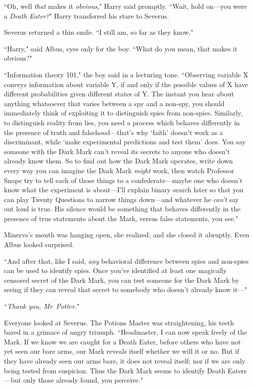 ``Oh, well \emph{that} makes it \emph{obvious}," Harry said promptly. ``Wait, hold on—you were a \emph{Death Eater?}" Harry transferred his stare to Severus.

Severus returned a thin smile. ``I still am, so far as they know."

``Harry," said Albus, eyes only for the boy. ``What do you mean, that makes it obvious?"

``Information theory 101," the boy said in a lecturing tone. ``Observing variable X conveys information about variable Y, if and only if the possible values of X have different probabilities given different states of Y\@. The instant you hear about anything whatsoever that varies between a spy and a non-spy, you should immediately think of exploiting it to distinguish spies from non-spies. Similarly, to distinguish reality from lies, you need a process which behaves differently in the presence of truth and falsehood—that's why `faith' doesn't work as a discriminant, while `make experimental predictions and test them' does. You say someone with the Dark Mark can't reveal its secrets to anyone who doesn't already know them. So to find out how the Dark Mark operates, write down every way you can imagine the Dark Mark \emph{might} work, then watch Professor Snape try to tell each of those things to a confederate—maybe one who doesn't know what the experiment is about—I'll explain binary search later so that you can play Twenty Questions to narrow things down—and whatever he \emph{can't} say out loud is true. His silence would be something that behaves differently in the presence of true statements about the Mark, versus false statements, you see."

Minerva's mouth was hanging open, she realized; and she closed it abruptly. Even Albus looked surprised.

``And after that, like I said, \emph{any} behavioral difference between spies and non-spies can be used to identify spies. Once you've identified at least one magically censored secret of the Dark Mark, you can test someone for the Dark Mark by seeing if they can reveal that secret to somebody who doesn't already know it—"

``\emph{Thank you, Mr~Potter.}"

Everyone looked at Severus. The Potions Master was straightening, his teeth bared in a grimace of angry triumph. ``Headmaster, I can now speak freely of the Mark. If we know we are caught for a Death Eater, before others who have not yet seen our bare arms, our Mark reveals itself whether we will it or no. But if they have already seen our arms bare, it does not reveal itself; nor if we are only being tested from suspicion. Thus the Dark Mark seems to identify Death Eaters—but only those already found, you perceive."

